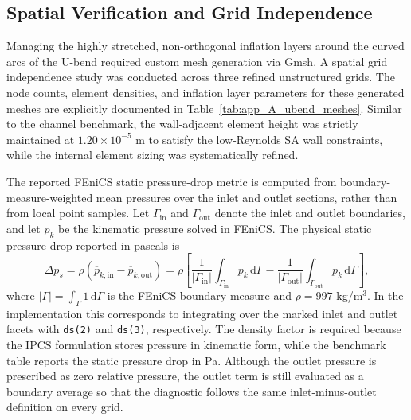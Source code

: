 \subsection{Spatial Verification and Grid Independence}
\label{subsec:app_A_ubend_mesh}
Managing the highly stretched, non-orthogonal inflation layers around the curved arcs of the U-bend required custom mesh generation via Gmsh. A spatial grid independence study was conducted across three refined unstructured grids. The node counts, element densities, and inflation layer parameters for these generated meshes are explicitly documented in Table~\ref{tab:app_A_ubend_meshes}. Similar to the channel benchmark, the wall-adjacent element height was strictly maintained at $1.20 \times 10^{-5}$ m to satisfy the low-Reynolds SA wall constraints, while the internal element sizing was systematically refined.

The reported FEniCS static pressure-drop metric is computed from boundary-measure-weighted mean pressures over the inlet and outlet sections, rather than from local point samples. Let $\Gamma_{\mathrm{in}}$ and $\Gamma_{\mathrm{out}}$ denote the inlet and outlet boundaries, and let $p_k$ be the kinematic pressure solved in FEniCS. The physical static pressure drop reported in pascals is
\begin{equation}
	\Delta p_s
	= \rho\left(\overline{p}_{k,\mathrm{in}}-\overline{p}_{k,\mathrm{out}}\right)
	= \rho\left[
	\frac{1}{|\Gamma_{\mathrm{in}}|}\int_{\Gamma_{\mathrm{in}}} p_k \, \mathrm{d}\Gamma
	-
	\frac{1}{|\Gamma_{\mathrm{out}}|}\int_{\Gamma_{\mathrm{out}}} p_k \, \mathrm{d}\Gamma
	\right],
	\label{eq:app_A_ubend_fenics_delta_p}
\end{equation}
where $|\Gamma|=\int_{\Gamma}1\,\mathrm{d}\Gamma$ is the FEniCS boundary measure and $\rho=997$ kg/m$^3$. In the implementation this corresponds to integrating over the marked inlet and outlet facets with \texttt{ds(2)} and \texttt{ds(3)}, respectively. The density factor is required because the IPCS formulation stores pressure in kinematic form, while the benchmark table reports the static pressure drop in Pa. Although the outlet pressure is prescribed as zero relative pressure, the outlet term is still evaluated as a boundary average so that the diagnostic follows the same inlet-minus-outlet definition on every grid.

